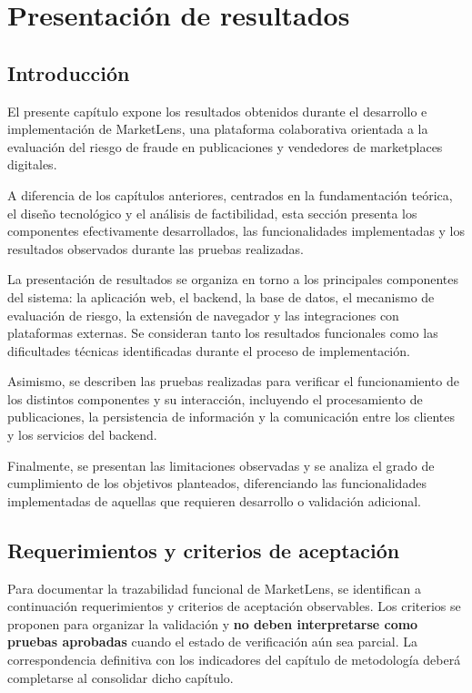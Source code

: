 
\chapter{Presentación de resultados}\label{cap:resultados}

\section{Introducción}

El presente capítulo expone los resultados obtenidos durante el
desarrollo e implementación de MarketLens, una plataforma colaborativa
orientada a la evaluación del riesgo de fraude en publicaciones y
vendedores de marketplaces digitales.

A diferencia de los capítulos anteriores, centrados en la fundamentación
teórica, el diseño tecnológico y el análisis de factibilidad, esta
sección presenta los componentes efectivamente desarrollados, las
funcionalidades implementadas y los resultados observados durante las
pruebas realizadas.

La presentación de resultados se organiza en torno a los principales
componentes del sistema: la aplicación web, el backend, la base de
datos, el mecanismo de evaluación de riesgo, la extensión de navegador y
las integraciones con plataformas externas. Se consideran tanto los
resultados funcionales como las dificultades técnicas identificadas
durante el proceso de implementación.

Asimismo, se describen las pruebas realizadas para verificar el
funcionamiento de los distintos componentes y su interacción, incluyendo
el procesamiento de publicaciones, la persistencia de información y la
comunicación entre los clientes y los servicios del backend.

Finalmente, se presentan las limitaciones observadas y se analiza el
grado de cumplimiento de los objetivos planteados, diferenciando las
funcionalidades implementadas de aquellas que requieren desarrollo o
validación adicional.


\section{Requerimientos y criterios de aceptación}
\label{sec:ml-requerimientos}

Para documentar la trazabilidad funcional de MarketLens, se identifican a continuación requerimientos y criterios de aceptación observables. Los criterios se proponen para organizar la validación y \textbf{no deben interpretarse como pruebas aprobadas} cuando el estado de verificación aún sea parcial. La correspondencia definitiva con los indicadores del capítulo de metodología deberá completarse al consolidar dicho capítulo.


